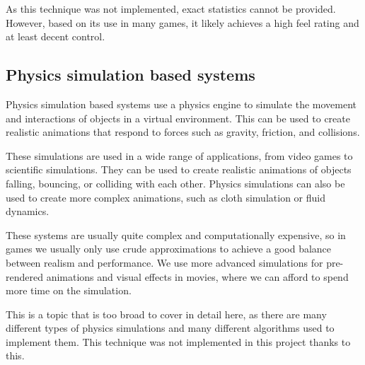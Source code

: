 As this technique was not implemented, exact statistics cannot be provided. However, based on its use in many games, it likely achieves a high feel rating and at least decent control.

\vspace{30pt}

\subsection{Physics simulation based systems}
\label{subsec:physics-simulation-based-systems}

Physics simulation based systems use a physics engine to simulate the movement and interactions of objects in a virtual environment. This can be used to create realistic animations that respond to forces such as gravity, friction, and collisions. 

These simulations are used in a wide range of applications, from video games to scientific simulations. They can be used to create realistic animations of objects falling, bouncing, or colliding with each other. Physics simulations can also be used to create more complex animations, such as cloth simulation or fluid dynamics.

These systems are usually quite complex and computationally expensive, so in games we usually only use crude approximations to achieve a good balance between realism and performance. We use more advanced simulations for pre-rendered animations and visual effects in movies, where we can afford to spend more time on the simulation.

This is a topic that is too broad to cover in detail here, as there are many different types of physics simulations and many different algorithms used to implement them. This technique was not implemented in this project thanks to this.

